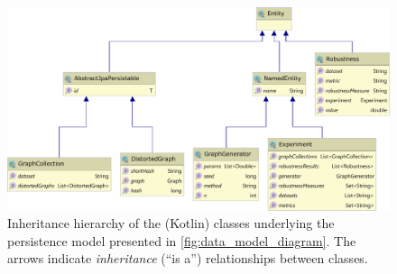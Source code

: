 \begin{figure}
\includegraphics[width=\linewidth]{data_model_classes_diagram.pdf}
\caption{Inheritance hierarchy of the (Kotlin) classes underlying the persistence model presented in \autoref{fig:data_model_diagram}.
The arrows indicate \textsl{inheritance} (``is a'') relationships between classes.}
\label{fig:data_model_classes_diagram}
\end{figure}
